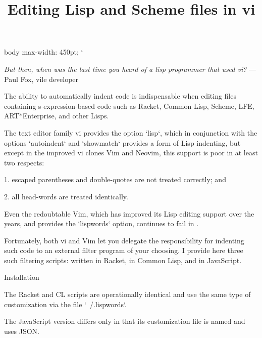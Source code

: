 


\overfullrule 0pt
\cssblock
body { max-width: 450pt; }
\endcssblock
\activettchar`
\title{Editing Lisp and Scheme files in vi}

\ifx\shipout\UnDeFiNeD
\centerline{}
\fi

\centerline{}

\medskip

{\obeylines\raggedleft
\ifx\shipout\UnDeFiNeD\small\fi
{\it But then, when was the last time you heard
of a lisp programmer that used vi?}
— Paul Fox, vile developer
}

\bigskip

The ability to automatically indent code is indispensable when editing
files containing s-expression-based code such as Racket, Common Lisp, Scheme,
LFE,
ART*Enterprise, and other Lisps.

The text editor family vi provides the option `lisp`, which in
conjunction with the options `autoindent` and `showmatch`
provides a form of Lisp indenting, but except in the improved vi
clones
Vim and Neovim, this support is poor in at least two respects:

1. escaped
parentheses and double-quotes are not treated correctly; and

2. all
head-words are
treated identically.

Even the redoubtable Vim, which has improved its Lisp editing
support over the years, and provides the `lispwords` option, continues to fail in
.

Fortunately, both vi and Vim let you delegate the responsibility
for indenting such code to an external filter program of your
choosing.  I provide here three such filtering scripts:
written in Racket,
 in Common
Lisp, and
 in JavaScript.

\beginsection Installation

The Racket
and CL scripts are
operationally identical and use the same type of customization
via the file `~/.lispwords`.

The JavaScript version differs only in that its
customization file is named
 and uses
JSON.


